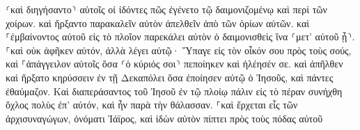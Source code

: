 \documentclass{openreader}
\begin{document}
⸂καὶ διηγήσαντο⸃ αὐτοῖς οἱ ἰδόντες πῶς ἐγένετο τῷ δαιμονιζομένῳ καὶ περὶ τῶν χοίρων. 
καὶ ἤρξαντο παρακαλεῖν αὐτὸν ἀπελθεῖν ἀπὸ τῶν ὁρίων αὐτῶν. 
καὶ ⸀ἐμβαίνοντος αὐτοῦ εἰς τὸ πλοῖον παρεκάλει αὐτὸν ὁ δαιμονισθεὶς ἵνα ⸂μετ’ αὐτοῦ ᾖ⸃. 
⸀καὶ οὐκ ἀφῆκεν αὐτόν, ἀλλὰ λέγει αὐτῷ· Ὕπαγε εἰς τὸν οἶκόν σου πρὸς τοὺς σούς, καὶ ⸀ἀπάγγειλον αὐτοῖς ὅσα ⸂ὁ κύριός σοι⸃ πεποίηκεν καὶ ἠλέησέν σε. 
καὶ ἀπῆλθεν καὶ ἤρξατο κηρύσσειν ἐν τῇ Δεκαπόλει ὅσα ἐποίησεν αὐτῷ ὁ Ἰησοῦς, καὶ πάντες ἐθαύμαζον. 
Καὶ διαπεράσαντος τοῦ Ἰησοῦ ἐν τῷ πλοίῳ πάλιν εἰς τὸ πέραν συνήχθη ὄχλος πολὺς ἐπ’ αὐτόν, καὶ ἦν παρὰ τὴν θάλασσαν. 
⸀καὶ ἔρχεται εἷς τῶν ἀρχισυναγώγων, ὀνόματι Ἰάϊρος, καὶ ἰδὼν αὐτὸν πίπτει πρὸς τοὺς πόδας αὐτοῦ 
\end{document}
